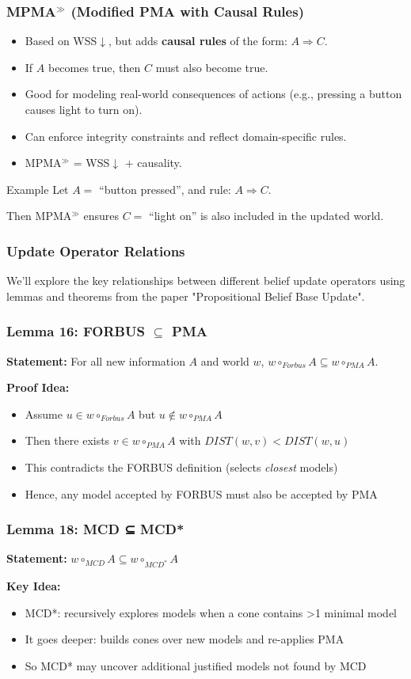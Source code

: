\documentclass{beamer}
\begin{document}
\begin{frame}
\frametitle{MPMA$^{\gg}$ (Modified PMA with Causal Rules)}
\begin{itemize}
    \item Based on WSS$\downarrow$, but adds \textbf{causal rules} of the form: $A \Rightarrow C$.
    \item If $A$ becomes true, then $C$ must also become true.
    \item Good for modeling real-world consequences of actions (e.g., pressing a button causes light to turn on).
    \item Can enforce integrity constraints and reflect domain-specific rules.
    \item MPMA$^{\gg}$ = WSS$\downarrow$ + causality.
\end{itemize}
\pause
\begin{block}{Example}
Let $A =$ “button pressed”, and rule: $A \Rightarrow C$.

Then MPMA$^{\gg}$ ensures $C =$ “light on” is also included in the updated world.
\end{block}
\end{frame}


\begin{frame}
\frametitle{Update Operator Relations}
We'll explore the key relationships between different belief update operators using lemmas and theorems from the paper "Propositional Belief Base Update".
\end{frame}


\begin{frame}
\frametitle{Lemma 16: FORBUS $\subseteq$ PMA}
\textbf{Statement:} For all new information $A$ and world $w$, $w \circ_{Forbus} A \subseteq w \circ_{PMA} A$.

\textbf{Proof Idea:}
\begin{itemize}
\item Assume $u \in w \circ_{Forbus} A$ but $u \notin w \circ_{PMA} A$
\item Then there exists $v \in w \circ_{PMA} A$ with $DIST(w, v) < DIST(w, u)$
\item This contradicts the FORBUS definition (selects \textit{closest} models)
\item Hence, any model accepted by FORBUS must also be accepted by PMA
\end{itemize}
\end{frame}


\begin{frame}
\frametitle{Lemma 18: MCD ⊆ MCD*}
\textbf{Statement:} $w \circ_{MCD} A \subseteq w \circ_{MCD^*} A$

\textbf{Key Idea:}
\begin{itemize}
\item MCD*: recursively explores models when a cone contains \textgreater 1 minimal model
\item It goes deeper: builds cones over new models and re-applies PMA
\item So MCD* may uncover additional justified models not found by MCD
\end{itemize}
\end{frame}
\end{document}
